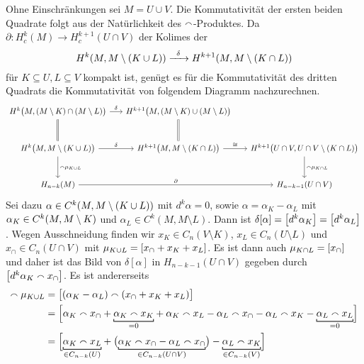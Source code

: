 \begin{beweis}
	Ohne Einschränkungen sei $M=U \cup V$. 
	Die Kommutativität der ersten beiden Quadrate folgt aus der Natürlichkeit des $\capp$-Produktes. 
	Da $\partial \colon H^k_c(M) \to H_c^{k+1}(U \cap V)$ der Kolimes der 
	\[
		H^k(M,M \setminus (K \cup L)) \grenzw{\delta} H^{k+1}(M,M \setminus (K \cap L)) 
	\]
	für $K \subseteq U, L \subseteq V$ kompakt ist, genügt es für die Kommutativität des dritten Quadrats die Kommutativität von folgendem Diagramm nachzurechnen.
	\[
		\begin{tikzcd}[row sep=large,column sep=1.6em]
			H^k \enbrace[\big]{M , (M \setminus K) \cap (M \setminus L)} \rar["\delta"] \dar[equal] & H^{k+1} \enbrace[\big]{M,(M \setminus K) \cup (M \setminus L)} \dar[equal]\\
			H^k \enbrace[\big]{M , M \setminus (K \cup L)} \dar["\capp \mu_{K \cup L}"] \rar["\delta"] & H^{k+1} \enbrace[\big]{M, M \setminus (K \cap L)} \rar["\cong"] & H^{k+1} \enbrace[\big]{U \cap V, U \cap V \setminus (K \cap L)} \dar["\capp \mu_{K \cap L}"] \\
			H_{n-k}(M) \ar[rr,"\partial"] & & H_{n-k-1}(U \cap V)
		\end{tikzcd}
	\]
	Sei dazu $\alpha \in C^{k} \enbrace*{M,M \setminus (K \cup L)}$ mit $d^k\alpha=0$, sowie $\alpha=\alpha_K-\alpha_L$ mit $\alpha_K \in C^k \enbrace*{M,M \setminus K}$ und $\alpha_L \in C^k(M,M \setminus L)$.
	Dann ist $\delta [\alpha]= \benbrace*{d^k \alpha_K} = \benbrace*{d^k \alpha_L}$.
	Wegen Ausschneidung finden wir $x_K \in C_n(V\setminus K)$, $x_L \in C_n(U \setminus L)$ und $x_\cap \in C_n(U \cap V)$ mit $\mu_{K \cup L} = \benbrace*{x_\cap +x_K+x_L}$.
	Es ist dann auch $\mu_{K \cap L} = \benbrace*{x_\cap}$ und daher ist das Bild von $\delta[\alpha]$ in $H_{n-k-1}(U \cap V)$ gegeben durch $\benbrace*{d^k \alpha_K \capp x_\cap}$.
	Es ist andererseits 
	\begin{align}
		[\alpha] \capp \mu_{K \cup L} &= \benbrace[\big]{(\alpha_K -\alpha_L) \capp (x_\cap + x_K+x_L)} \\
		&= \benbrace[\Big]{\alpha_K \capp x_\cap  + \Underbracket{\alpha_K \capp x_K}{=0} + \alpha_K \capp x_L - \alpha_L \capp x_\cap - \alpha_L \capp x_K - \Underbracket{\alpha_L \capp x_L}{=0}} \\
		&= \benbrace[\Big]{\Underbracket{\alpha_K \capp x_L}{\in C_{n-k}(U)} + \enbrace[\big]{\Underbracket{\alpha_K \capp x_\cap - \alpha_L \capp x_\cap}{\in C_{n-k}(U \cap V)}} - \Underbracket{\alpha_L \capp x_K}{\in C_{n-k}(V)}} 

\end{align}
\end{beweis}
